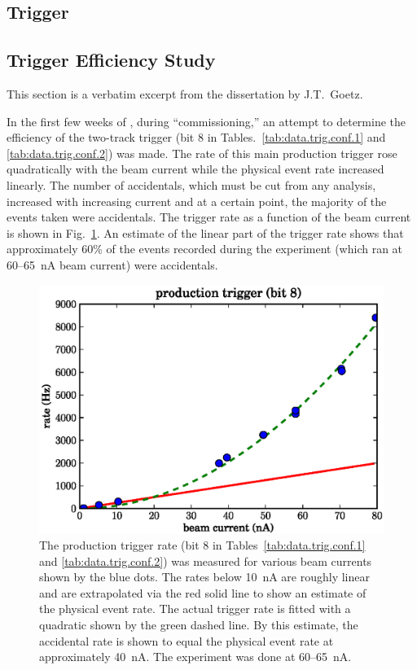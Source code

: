 \subsection{\label{sec:calib.trig}Trigger}

\subsection{\label{sec:calib.trig.eff}Trigger Efficiency Study}

\begin{center} \color{OliveGreen}
This section is a verbatim excerpt from the dissertation by J.T.\ Goetz\cite{clas.thesis.goetz}.
\end{center}

In the first few weeks of , during ``commissioning,'' an attempt to determine the efficiency of the two-track trigger (bit 8 in Tables.~\ref{tab:data.trig.conf.1} and \ref{tab:data.trig.conf.2}) was made. The rate of this main production trigger rose quadratically with the beam current while the physical event rate increased linearly. The number of accidentals, which must be cut from any analysis, increased with increasing current and at a certain point, the majority of the events taken were accidentals. The trigger rate as a function of the beam current is shown in Fig.~\ref{fig:data.trig.eff}. An estimate of the linear part of the trigger rate shows that approximately 60\% of the events recorded during the  experiment (which ran at 60--65~nA beam current) were accidentals.

\begin{figure}\begin{center}
\includegraphics[width=0.7\columnwidth]{figures/calib/trig/trigger_study.eps}
\caption[Trigger Rate vs. Beam Current]{\label{fig:data.trig.eff}The production trigger rate (bit 8 in Tables~\ref{tab:data.trig.conf.1} and \ref{tab:data.trig.conf.2}) was measured for various beam currents shown by the blue dots. The rates below 10~nA are roughly linear and are extrapolated via the red solid line to show an estimate of the physical event rate. The actual trigger rate is fitted with a quadratic shown by the green dashed line. By this estimate, the accidental rate is shown to equal the physical event rate at approximately 40~nA. The  experiment was done at 60--65~nA.}
\end{center}\end{figure}

\FloatBarrier
